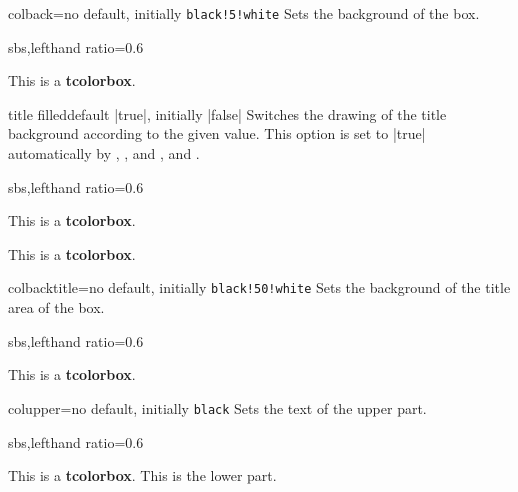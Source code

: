 \begin{docTcbKey}{colback}{=}{no default, initially \texttt{black!5!white}}
  Sets the background  of the box.
\begin{dispExample*}{sbs,lefthand ratio=0.6}
\begin{tcolorbox}[colback=red!50!white]
This is a \textbf{tcolorbox}.
\end{tcolorbox}
\end{dispExample*}
\end{docTcbKey}


\begin{docTcbKey}{title filled}{}{default |true|, initially |false|}
  Switches the drawing of the title background according to the given value.
  This option is set to |true| automatically by ,
  , and ,
  and .

\begin{dispExample*}{sbs,lefthand ratio=0.6}
\begin{tcolorbox}[title=My title,title filled]
This is a \textbf{tcolorbox}.
\end{tcolorbox}
\begin{tcolorbox}[title=My title,
  title filled=false]
This is a \textbf{tcolorbox}.
\end{tcolorbox}
\end{dispExample*}
\end{docTcbKey}


\begin{docTcbKey}{colbacktitle}{=}{no default, initially \texttt{black!50!white}}
  Sets the background  of the title area of the box.
\begin{dispExample*}{sbs,lefthand ratio=0.6}
\begin{tcolorbox}[colbacktitle=red!50!white,
  title=My title,coltitle=black,
  fonttitle=\bfseries]
This is a \textbf{tcolorbox}.
\end{tcolorbox}
\end{dispExample*}
\end{docTcbKey}



\clearpage

\begin{docTcbKey}{colupper}{=}{no default, initially \texttt{black}}
  Sets the text  of the upper part.
\begin{dispExample*}{sbs,lefthand ratio=0.6}
\begin{tcolorbox}[colupper=red!75!black]
This is a \textbf{tcolorbox}.
\tcblower
This is the lower part.
\end{tcolorbox}
\end{dispExample*}
\end{docTcbKey}


